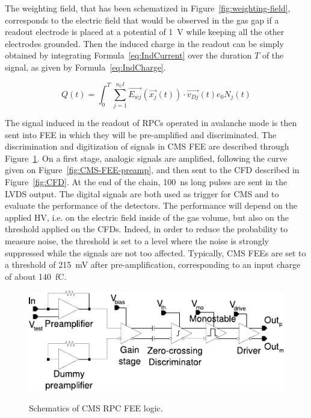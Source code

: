 	The weighting field, that has been schematized in Figure~\ref{fig:weighting-field}, corresponds to the electric field that would be observed in the gas gap if a readout electrode is placed at a potential of \SI{1}{V} while keeping all the other electrodes grounded. Then the induced charge in the readout can be simply obtained by integrating Formula~\ref{eq:IndCurrent} over the duration $T$ of the signal, as given by Formula~\ref{eq:IndCharge}.
	
	\begin{equation}
	\label{eq:IndCharge}
	Q(t) = \int_0^T \sum_{j=1}^{n_Cl} \overrightarrow{E_{wj}}(\overrightarrow{x_j}(t)) \cdot \overrightarrow{v_{Dj}}(t) e_0 N_j(t)
	\end{equation}
	
	The signal induced in the readout of RPCs operated in avalanche mode is then sent into \acl{FEE} in which they will be pre-amplified and discriminated. The discrimination and digitization of signals in CMS FEE are described through Figure~\ref{fig:CMS-FEE}. On a first stage, analogic signals are amplified, following the curve given on Figure~\ref{fig:CMS-FEE-preamp}, and then sent to the \acf{CFD} described in Figure~\ref{fig:CFD}. At the end of the chain, \SI{100}{ns} long pulses are sent in the LVDS output. The digital signals are both used as trigger for CMS and to evaluate the performance of the detectors. The performance will depend on the applied HV, i.e. on the electric field inside of the gas volume, but also on the threshold applied on the CFDs. Indeed, in order to reduce the probability to measure noise, the threshold is set to a level where the noise is strongly suppressed while the signals are not too affected. Typically, CMS FEEs are set to a threshold of \SI{215}{mV} after pre-amplification, corresponding to an input charge of about \SI{140}{fC}.
	
	\begin{figure}[H]
		\centering
		\includegraphics[width = 0.6\plotwidth]{fig/chapt4/CMS-FEE.pdf}\\
		\caption{\label{fig:CMS-FEE} Schematics of CMS RPC FEE logic.}
	\end{figure}
	
